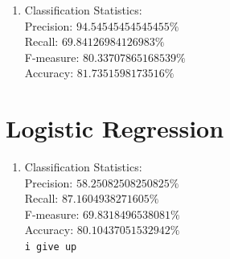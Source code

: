 \documentclass[12pt]{article}
\begin{document}
	\begin{enumerate}
		
		\item Classification Statistics:\\
		
		Precision: $94.54545454545455\%$ \\
		Recall: $69.84126984126983\%$ \\
		F-measure: $80.33707865168539\%$ \\
		Accuracy: $81.7351598173516\%$ \\

		
	\end{enumerate}
	
	
	
	\section{Logistic Regression}
	
	\begin{enumerate}
		
		\item Classification Statistics:\\
		
		Precision: $58.25082508250825\%$\\
		Recall: $87.1604938271605\%$\\
		F-measure: $69.8318496538081\%$\\
		Accuracy: $80.10437051532942\%$\\
		
		\texttt{i give up}
		
	\end{enumerate}
	
\end{document}
